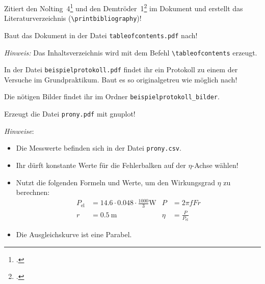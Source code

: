 \documentclass[a4paper, 12pt, headsepline, parskip=half-, headlines=3.1]{scrartcl}
\newcounter{aufgabe}
\newenvironment{aufgabe*}[1][]{\stepcounter{aufgabe}
\noindent\textbf{Aufgabe \arabic{aufgabe}.} #1}{\bigskip}
\begin{document}
\begin{aufgabe*}
	Zitiert den Nolting~4\footcite{nolting4} und den Demtröder~1\footcite{demtröder1} im Dokument und erstellt das Literaturverzeichnis (\lstinline!\printbibliography!)!
\end{aufgabe*}

\begin{aufgabe*}
Baut das Dokument in der Datei \texttt{tableofcontents.pdf} nach!

\emph{Hinweis:} Das Inhaltsverzeichnis wird mit dem Befehl \lstinline!\tableofcontents! erzeugt.
\end{aufgabe*}

\begin{aufgabe*}
In der Datei \texttt{beispielprotokoll.pdf} findet ihr ein Protokoll zu einem der Versuche im Grundpraktikum. Baut es so originalgetreu wie möglich nach!

Die nötigen Bilder findet ihr im Ordner \texttt{beispielprotokoll\_bilder}.
\end{aufgabe*}

\begin{aufgabe*}
	Erzeugt die Datei \texttt{prony.pdf} mit gnuplot!

	\emph{Hinweise}:
	\begin{itemize}
		\item Die Messwerte befinden sich in der Datei \texttt{prony.csv}.
		\item Ihr dürft konstante Werte für die Fehlerbalken auf der $η$-Achse wählen!
		\item Nutzt die folgenden Formeln und Werte, um den Wirkungsgrad $η$ zu berechnen:
		\begin{align*}
			P_\text{el} &= \num{14,6} ⋅ \num{0,048} ⋅ \frac{1000}{3} \si{\W} &
			P &= 2πfFr \\
			r &= \SI{0,5}{\m} &
			η &= \frac{P}{P_\text{el}}
		\end{align*}
		\item Die Ausgleichskurve ist eine Parabel.
	\end{itemize}
\end{aufgabe*}
\end{document}

